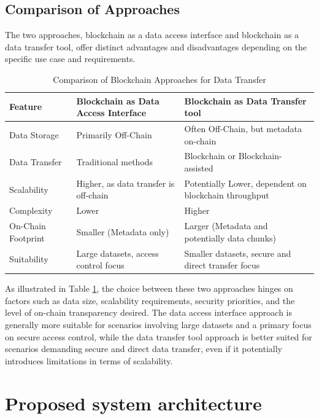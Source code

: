\documentclass[10pt]{llncs}
\begin{document}
\subsection{Comparison of Approaches}

The two approaches, blockchain as a data access interface and blockchain as a data transfer tool, offer distinct advantages and disadvantages depending on the specific use case and requirements.

\begin{table}[h!]
\caption{Comparison of Blockchain Approaches for Data Transfer}
\label{tab:comparison}
\begin{tabular}{|p{20mm}|p{50mm}|p{50mm}|}
\hline
Feature & Blockchain as Data Access Interface & Blockchain as Data Transfer tool \\ \hline
Data Storage & Primarily Off-Chain & Often Off-Chain, but metadata on-chain \\ \hline
Data Transfer & Traditional methods & Blockchain or Blockchain-assisted \\ \hline
Scalability & Higher, as data transfer is off-chain & Potentially Lower, dependent on blockchain throughput \\ \hline
Complexity & Lower & Higher \\ \hline
On-Chain Footprint & Smaller (Metadata only) & Larger (Metadata and potentially data chunks) \\ \hline
Suitability & Large datasets, access control focus & Smaller datasets, secure and direct transfer focus \\ \hline
\end{tabular}

\end{table}

As illustrated in Table \ref{tab:comparison}, the choice between these two approaches hinges on factors such as data size, scalability requirements, security priorities, 
and the level of on-chain transparency desired. 
The data access interface approach is generally more suitable for scenarios involving large datasets and a primary focus on secure access control, while the data transfer tool 
approach is better suited for scenarios demanding secure and direct data transfer, even if it potentially introduces limitations in terms of scalability.

\section{Proposed system architecture} \label{architecture}
\end{document}
